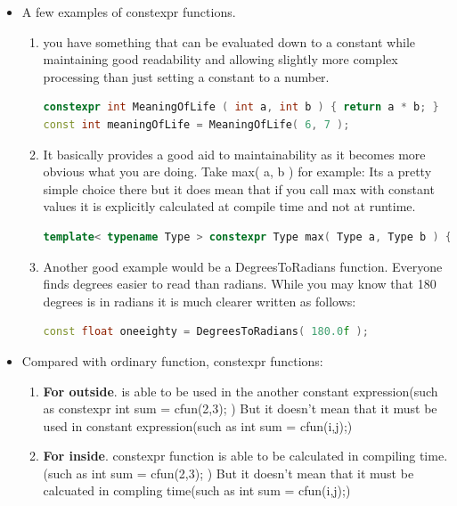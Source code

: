 \documentclass[a4paper,12pt,twoside]{book}
\begin{document}
\begin{itemize}
	\item A few examples of constexpr functions. 
	\begin{enumerate}
		\item you have something that can be evaluated down to a constant while maintaining good readability and allowing slightly more complex processing than just setting a constant to a number.
\begin{lstlisting}[frame=single, language=c++]
constexpr int MeaningOfLife ( int a, int b ) { return a * b; }
const int meaningOfLife = MeaningOfLife( 6, 7 );
\end{lstlisting}
		
		\item It basically provides a good aid to maintainability as it becomes more obvious what you are doing. Take max( a, b ) for example: Its a pretty simple choice there but it does mean that if you call max with constant values it is explicitly calculated at compile time and not at runtime.
\begin{lstlisting}[frame=single, language=c++]
template< typename Type > constexpr Type max( Type a, Type b ) { return a < b ? b : a; }
\end{lstlisting}
		
\item Another good example would be a DegreesToRadians function. Everyone finds degrees easier to read than radians. While you may know that 180 degrees is in radians it is much clearer written as follows:
\begin{lstlisting}[frame=single, language=c++]
const float oneeighty = DegreesToRadians( 180.0f );
\end{lstlisting}

\end{enumerate}
	
	
	\item Compared with ordinary function, constexpr functions:
	\begin{enumerate}
		\item \textbf{For outside}. is able to be used in the another constant expression(such as constexpr int sum = cfun(2,3); ) But it doesn't mean that it must be used in constant expression(such as int sum = cfun(i,j);)
		
		\item \textbf{For inside}. constexpr function is able to be calculated in compiling time. (such as int sum = cfun(2,3); ) But it doesn't mean that it must be calcuated in compling time(such as int sum = cfun(i,j);)
	\end{enumerate}


\end{itemize}
\end{document}
